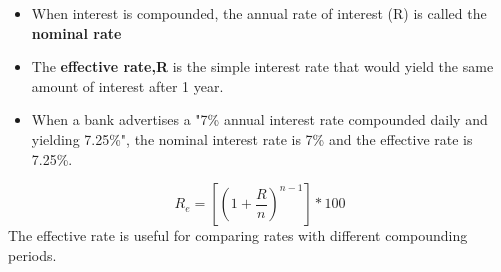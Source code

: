 \documentclass{article}
\begin{document}
	\begin{itemize}
		\item When interest is compounded, the annual rate of interest (R) is called the \textbf{nominal rate}
		\item The \textbf{effective rate,R} is the simple interest rate that would yield the same amount of interest after 1 year.
		\item When a bank advertises a "7\% annual interest rate compounded daily and yielding 7.25\%", the nominal interest rate is 7\% and the effective rate is 7.25\%.
	\end{itemize}
\begin{equation}
R_{e} = [(1 + \frac{R}{n})^{n-1}]*100
\end{equation}
The effective rate is useful for comparing rates with different compounding periods.
\end{document}
